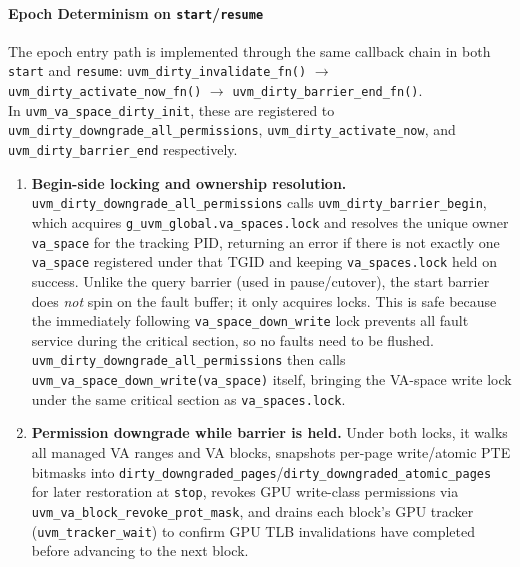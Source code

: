 \paragraph{Epoch Determinism on \texttt{start}/\texttt{resume}}
The epoch entry path is implemented through the same callback chain in both
\texttt{start} and \texttt{resume}:
\texttt{uvm\_dirty\_invalidate\_fn()} $\rightarrow$
\texttt{uvm\_dirty\_activate\_now\_fn()} $\rightarrow$
\texttt{uvm\_dirty\_barrier\_end\_fn()}.
\\In \texttt{uvm\_va\_space\_dirty\_init}, these are registered to
\texttt{uvm\_dirty\_downgrade\_all\_permissions},
\texttt{uvm\_dirty\_activate\_now}, and \texttt{uvm\_dirty\_barrier\_end}
respectively.

\begin{enumerate}
    \item \textbf{Begin-side locking and ownership resolution.}
          \texttt{uvm\_dirty\_downgrade\_all\_permissions} calls
          \texttt{uvm\_dirty\_barrier\_begin}, which acquires
          \texttt{g\_uvm\_global.va\_spaces.lock} and resolves the unique owner
          \texttt{va\_space} for the tracking PID, returning an error if there
          is not exactly one \texttt{va\_space} registered under that TGID and
          keeping \texttt{va\_spaces.lock} held on success.
          Unlike the query barrier (used in pause/cutover), the start barrier
          does \emph{not} spin on the fault buffer; it only acquires locks.
          This is safe because the immediately following \texttt{va\_space\_down\_write}
          lock prevents all fault service during the critical section, so no
          faults need to be flushed.
          \texttt{uvm\_dirty\_downgrade\_all\_permissions} then calls
          \texttt{uvm\_va\_space\_down\_write(va\_space)} itself, bringing the
          VA-space write lock under the same critical section as
          \texttt{va\_spaces.lock}.

    \item \textbf{Permission downgrade while barrier is held.}
          Under both locks, it walks all managed VA ranges and VA blocks,
          snapshots per-page write/atomic PTE bitmasks into
          \texttt{dirty\_downgraded\_pages}/\texttt{dirty\_downgraded\_atomic\_pages}
          for later restoration at \texttt{stop}, revokes GPU write-class
          permissions via \texttt{uvm\_va\_block\_revoke\_prot\_mask}, and
          drains each block's GPU tracker (\texttt{uvm\_tracker\_wait}) to
          confirm GPU TLB invalidations have completed before advancing to the
          next block.


\end{enumerate}
